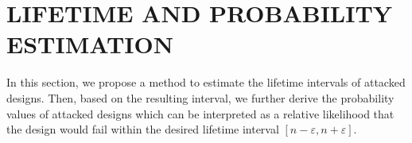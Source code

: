 
\begin{comment}
\section{LIFETIME ESTIMATION}
\label{sec:lt_estimation}
In this section, we propose a method to estimate the lifetime interval of attacked designs, considering the workload variations based on the aforementioned assumption and definition of critical operational mode.

Based on the assumption, the union of critical operational modes of all candidate paths is equivalent to the universal set of operational modes, i.e., all operational modes. Thus, for the purpose of covering all operational modes, we have to consider the severe aging condition of each candidate path, such that the associated critical operational modes are applied to predict the lifetime of other paths using a binary search method.

For example, given the candidate path $i$, the other path $j$, and time variable $t$, the goal of the method is to predict $j's$ lifetime by binarily searching toward a convergent $t$. That is, during the binary search, the timing variable $t$ will be iteratively calibrated according to the $j's$ setup timing constraint, formulated in Equation~(\ref{eq:setup}), and eventually $j's$ lifetime will converge toward the value of $t$. Where $j's$ aging rate is derived by the aging correlation between $i$ and $j$ (i.e., regression equation of $i$ on $j$) and $i's$ aging rate is derived from Equation~(\ref{eq:worst}). 
As a result, when $i$ is considered undergoing severe aging, we can obtain the other paths' lifetimes, among which we choose the smallest one as the lifetime of the attacked design.

In accordance with the former procedure, we can derive one lifetime value of a path being compromised with malicious aging. By considering all candidate paths undergoing severe aging, we can derive a group of lifetime values, among which smallest one and biggest one are the resulting interval based on the attack.
\end{comment}
\section{LIFETIME AND PROBABILITY ESTIMATION}
\label{sec:lt_estimation}
In this section, we propose a method to estimate the lifetime intervals of attacked designs. Then, based on the resulting interval, we further derive the probability values of attacked designs which can be interpreted as a relative likelihood that the design would fail within the desired lifetime interval $[n-\varepsilon, n+\varepsilon]$.


